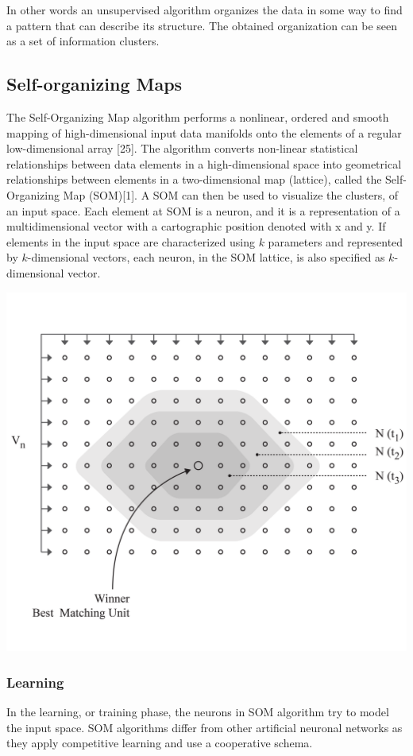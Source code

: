 \documentclass{article}
\begin{document}
In other words an unsupervised algorithm organizes the data in some way to find a pattern that can describe its structure. The obtained organization can be seen as a set of information clusters.

\subsection{Self-organizing Maps} %
The Self-Organizing Map algorithm performs a nonlinear, ordered and smooth mapping of high-dimensional input data manifolds onto the elements of a regular low-dimensional array [25]. The algorithm converts non-linear statistical relationships between data elements in a high-dimensional space into geometrical relationships between elements in a two-dimensional map (lattice), called the Self-Organizing Map (SOM)[1]. A SOM can then be used to visualize the clusters, of an input space. Each element at SOM is a neuron, and it is a representation of a multidimensional vector with a cartographic position denoted with x and y. If elements in the input space are characterized using $k$ parameters and represented by $k$-dimensional vectors, each neuron, in the SOM lattice, is also specified as $k$-dimensional vector.

	\begin{center}\includegraphics[scale=0.08]{som} \end{center}

\subsubsection{Learning} %
In the learning, or training phase, the neurons in SOM algorithm try to model the input space. 
SOM algorithms differ from other artificial neuronal networks as they apply competitive learning and use a cooperative schema. 
\end{document}
